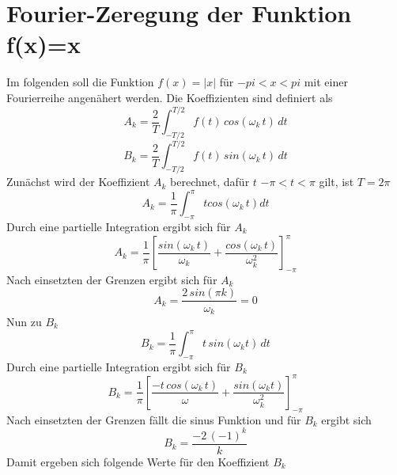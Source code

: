 \section{Fourier-Zeregung der Funktion f(x)=x}
    Im folgenden soll die Funktion $f(x)=|x|$ für $-pi < x < pi$ mit einer Fourierreihe angenähert werden.
    Die Koeffizienten sind definiert als
\newpage
\begin{equation}
  A_k=\frac{2}{T} \int_{-T/2}^{T/2} f(t) \, cos(\omega_k \, t) \,  dt
\end{equation}
\begin{equation}
  B_k=\frac{2}{T} \int_{-T/2}^{T/2} f(t) \, sin(\omega_k \, t) \, dt
\end{equation}
  Zunächst wird der Koeffizient $A_k$ berechnet, dafür $t$  $-\pi < t < \pi$ gilt, ist $T = 2\pi$
\begin{equation}
  A_k = \frac{1}{\pi} \int_{-\pi}^{\pi} t cos(\omega_k\, t) dt
\end{equation}
  Durch eine partielle Integration ergibt sich für $A_k$
\begin{equation}
  A_k= \frac{1}{\pi} \left [\frac{sin(\omega_k \, t)}{\omega_k} + \frac{cos(\omega_k \, t)}{\omega_k^2}  \right]_{-\pi}^{\pi} 
\end{equation}
  Nach einsetzten der Grenzen ergibt sich für $A_k$
\begin{equation}
  A_k = \frac{2 \, sin(\pi k)}{\omega_k} = 0
\end{equation}
  Nun zu $B_k$
\begin{equation}
  B_k = \frac{1}{\pi} \int_{-\pi}^{\pi} t \, sin (\omega_k t) \, dt
\end{equation}
  Durch eine partielle Integration ergibt sich für $B_k$
\begin{equation}
  B_k = \frac{1}{\pi} \left [\frac{- t \, cos(\omega_k \,  t)}{\omega} + \frac{sin(\omega_k t)}{\omega_k^2}\right]_{-\pi}^{\pi} 
\end{equation}
  Nach einsetzten der Grenzen fällt die sinus Funktion und für $B_k$ ergibt sich
\begin{equation}
  B_k = \frac{-2 \, (-1)^k}{k}
\end{equation}
Damit ergeben sich folgende Werte für den Koeffizient $B_k$

